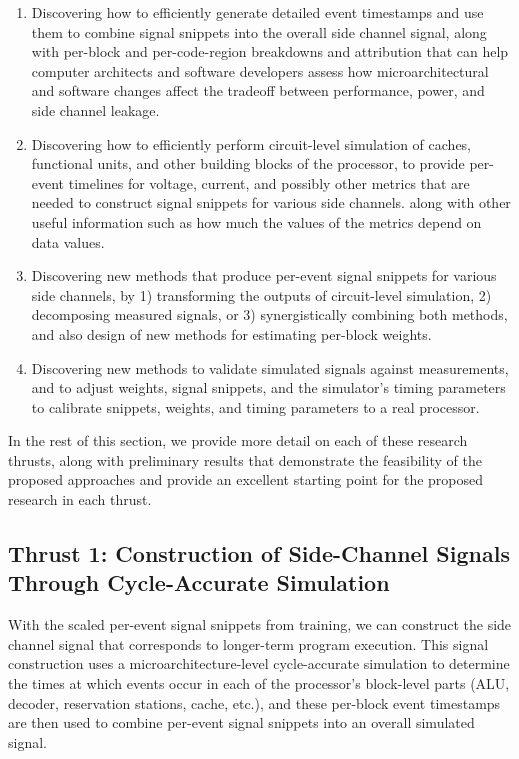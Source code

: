 \begin{enumerate}[topsep=0pt,itemsep=0pt]
\item Discovering how to efficiently generate detailed event timestamps and use them to combine signal snippets into the overall side channel signal, along with per-block and per-code-region breakdowns and attribution that can help computer architects and software developers assess how microarchitectural and software changes affect the tradeoff between performance, power, and side channel leakage.
\item Discovering how to efficiently perform circuit-level simulation of caches, functional units, and other building blocks of the processor, to provide per-event timelines for voltage, current, and possibly other metrics that are needed to construct signal snippets for various side channels. along with other useful information such as how much the values of the metrics depend on data values.
\item Discovering new methods that produce per-event signal snippets for various side channels, by 1) transforming the outputs of circuit-level simulation, 2) decomposing measured signals, or 3) synergistically combining both methods, and also design of new methods for estimating per-block weights.
\item Discovering new methods to validate simulated signals against measurements, and to adjust weights, signal snippets, and the simulator's timing parameters to calibrate snippets, weights, and timing parameters to a real processor.
\end{enumerate}

In the rest of this section, we provide more detail on each of these research thrusts, along with preliminary results that demonstrate the feasibility of the proposed approaches and provide an excellent starting point for the proposed research in each thrust.

\subsection{Thrust 1: Construction of Side-Channel Signals Through Cycle-Accurate Simulation}

With the scaled per-event signal snippets from training, we can construct the side channel signal that corresponds to longer-term program execution. This signal construction uses a microarchitecture-level cycle-accurate simulation to determine the times at which events occur in each of the processor's block-level parts (ALU, decoder, reservation stations, cache, etc.), and these per-block event timestamps are then used to combine per-event signal snippets into an overall simulated signal.

